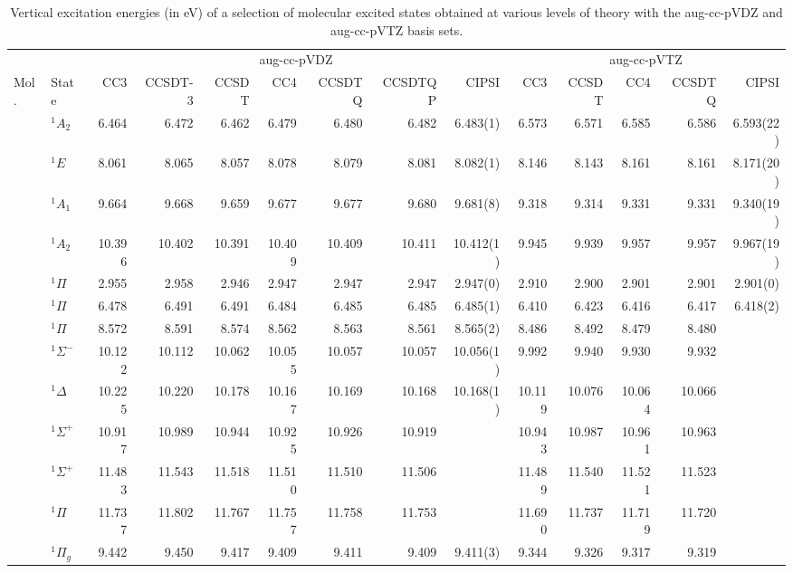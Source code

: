 \documentclass[aps,prb,reprint,noshowkeys,superscriptaddress]{revtex4-1}
\newcommand{\mc}{\multicolumn}
\begin{document}
\begin{squeezetable}
\begin{table*}
	\caption{Vertical excitation energies (in eV) of a selection of molecular excited states obtained at various levels of theory with the aug-cc-pVDZ and aug-cc-pVTZ basis sets.
	\label{tab:BigTab}}
	\begin{ruledtabular}
	\begin{tabular}{llrrrrrrrrrrrr}
				&		&	\mc{7}{c}{aug-cc-pVDZ}		&		\mc{5}{c}{aug-cc-pVTZ}		\\	
				\cline{3-9} \cline{10-14}
	Mol.	&	State				&CC3	&CCSDT-3&CCSDT	&CC4	&CCSDTQ	&CCSDTQP	&CIPSI	
									&CC3	&CCSDT	&CC4	&CCSDTQ	&CIPSI			\\
	\hline
	\ce{NH3}	&	$^1A_2$ 		&6.464	&6.472	&6.462	&6.479	&6.480	&6.482	&6.483(1)	&6.573	&6.571	&6.585	&6.586	&	6.593(22)	\\	
				&	$^1E$			&8.061	&8.065	&8.057	&8.078	&8.079	&8.081	&8.082(1)	&8.146	&8.143	&8.161	&8.161	&	8.171(20)	\\	
				&	$^1A_1$ 		&9.664	&9.668	&9.659	&9.677	&9.677	&9.680	&9.681(8)	&9.318	&9.314	&9.331	&9.331	&	9.340(19)	\\
				&	$^1A_2$ 		&10.396	&10.402	&10.391	&10.409	&10.409	&10.411	&10.412(1)	&9.945	&9.939	&9.957	&9.957	&	9.967(19)	\\
	\ce{BH}		&	$^1\Pi$ 		&2.955	&2.958	&2.946	&2.947	&2.947	&2.947	&2.947(0)	&2.910	&2.900	&2.901	&2.901	&2.901(0)	\\
	\ce{BF}		&	$^1\Pi$ 		&6.478	&6.491	&6.491	&6.484	&6.485	&6.485	&6.485(1)	&6.410	&6.423	&6.416	&6.417	&6.418(2)\\
	\ce{CO}		&	$^1\Pi$ 		&8.572	&8.591	&8.574	&8.562	&8.563	&8.561	&8.565(2)	&8.486	&8.492	&8.479	&8.480	&	\\
				&	$^1\Sigma^-$ 	&10.122	&10.112	&10.062	&10.055	&10.057	&10.057	&10.056(1)	&9.992	&9.940	&9.930	&9.932	&	\\
				&	$^1\Delta$ 		&10.225	&10.220	&10.178	&10.167	&10.169	&10.168	&10.168(1)	&10.119	&10.076	&10.064	&10.066	&	\\
				&	$^1\Sigma^+$ 	&10.917	&10.989	&10.944	&10.925	&10.926	&10.919	&			&10.943	&10.987	&10.961	&10.963	&	\\
				&	$^1\Sigma^+$ 	&11.483	&11.543	&11.518	&11.510	&11.510	&11.506	&			&11.489	&11.540	&11.521	&11.523	&	\\
				&	$^1\Pi$ 		&11.737	&11.802	&11.767	&11.757	&11.758	&11.753	&			&11.690	&11.737	&11.719	&11.720	&	\\
	\ce{N2}		&	$^1\Pi_g$  		&9.442	&9.450	&9.417	&9.409	&9.411	&9.409	&9.411(3)	&9.344	&9.326	&9.317	&9.319	&	\\

\end{tabular}
\end{ruledtabular}
\end{table*}
\end{squeezetable}
\end{document}
